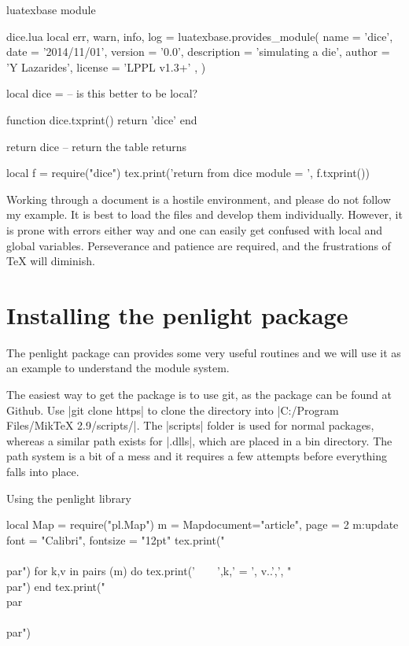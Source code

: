 \begin{texexample}{luatexbase module}{}
\begin{filecontents*}{dice.lua}
local err, warn, info, log = luatexbase.provides_module({
     name      = 'dice',
     date       = '2014/11/01',
     version   = '0.0',
     description = 'simulating a die',
     author      = 'Y Lazarides',
     license      =  'LPPL v1.3+' ,
})

local dice =  {}    -- is this better to be local?

function dice.txprint()
    return 'dice'
end    

return dice         -- return the table returns {} 
\end{filecontents*} 

\begin{luacode}   
local  f = require("dice")           
        tex.print('return from dice module = ', f.txprint())
\end{luacode}

\end{texexample}

Working through a document is a hostile environment, and please do not follow my example. It is best to
load the files and develop them individually. However, it is prone with errors either way and one can easily get confused with local and global variables. Perseverance and patience are required, and the frustrations of TeX will diminish.

\section{Installing the penlight package}

The penlight package can provides some very useful routines and we will use it as an example
to understand the module system.

The easiest way to get the package is to use git, as the package can be found at Github. Use |git clone https|  to clone the directory into |C:/Program Files/MikTeX 2.9/scripts/|. The |scripts| folder is used for normal packages, whereas a similar path exists for |.dlls|, which are placed in a bin directory. The path system is a bit of a mess and it requires a few attempts before everything falls into place. 

\begin{texexample}{Using the penlight library}{}
\begin{luacode}
local Map = require("pl.Map")
       m = Map{document="article", 
                     page = 2}
       m:update {font = "Calibri", fontsize = "12pt"}               
       tex.print("\\{\\par")
       for k,v in pairs (m)  do
           tex.print('~~~~',k,' = ', v..',', "\\par")
       end   
       tex.print("\\par\\}\\par") 
\end{luacode}
\end{texexample}



